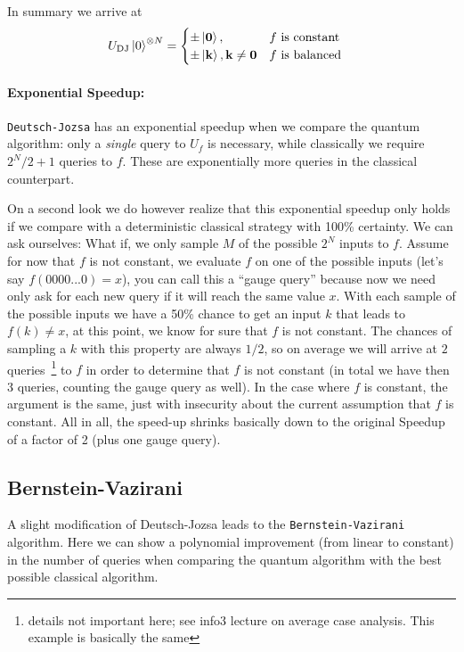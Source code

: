  In summary we arrive at
 \begin{align}
     {U}_\text{DJ} \ket{0}^{\otimes N} &= \begin{cases}
         \pm \ket{\mathbf{0}}, & f \text{ is constant}\\
         \pm \ket{\mathbf{k}}, \mathbf{k}\neq \mathbf{0} & f \text{ is balanced}
     \end{cases}
 \end{align}

 \paragraph{Exponential Speedup:} \texttt{Deutsch-Jozsa}  has an exponential speedup when we compare the quantum algorithm: only a \textit{single} query to $U_f$ is necessary, while classically we require $2^N/2 + 1$ queries to $f$. These are exponentially more queries in the classical counterpart.

On a second look we do however realize that this exponential speedup only holds if we compare with a deterministic classical strategy with 100\% certainty. We can ask ourselves: What if, we only sample $M$ of the possible $2^N$ inputs to $f$. Assume for now that $f$ is not constant, we evaluate $f$ on one of the possible inputs (let's say $f(0000...0)=x$), you can call this a ``gauge query'' because now we need only ask for each new query if it will reach the same value $x$. With each sample of the possible inputs we have a 50\% chance to get an input $k$ that leads to $f(k)\neq x$, at this point, we know for sure that $f$ is not constant. The chances of sampling a $k$ with this property are always $1/2$, so on average we will arrive at $2$ queries~\footnote{details not important here; see info3 lecture on average case analysis. This example is basically the same} to $f$ in order to determine that $f$ is not constant (in total we have then 3 queries, counting the gauge query as well). In the case where $f$ is constant, the argument is the same, just with insecurity about the current assumption that $f$ is constant.
All in all, the speed-up shrinks basically down to the original Speedup of a factor of 2 (plus one gauge query). 

\subsection{Bernstein-Vazirani}
A slight modification of Deutsch-Jozsa leads to the \texttt{Bernstein-Vazirani} algorithm. Here we can show a polynomial improvement (from linear to constant) in the number of queries when comparing the quantum algorithm with the best possible classical algorithm. 

